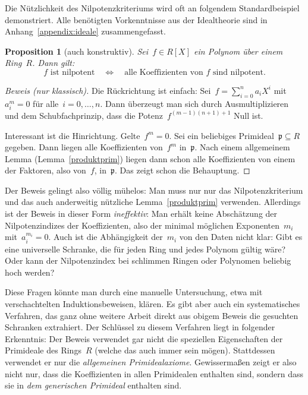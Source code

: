 \documentclass[a4paper,ngerman,12pt]{scrartcl}
\theoremstyle{definition}
\theoremstyle{plain}
\newtheorem{prop}[defn]{Proposition}
\theoremstyle{remark}
\newcommand{\pp}{\mathfrak{p}}
\renewcommand{\_}{\mathpunct{.}\,}
\newcommand{\?}{\,{:}\,}
\begin{document}
Die Nützlichkeit des Nilpotenzkriteriums wird oft an folgendem Standardbeispiel
demonstriert. Alle benötigten Vorkenntnisse aus der Idealtheorie sind in
Anhang~\ref{appendix:ideale} zusammengefasst.

\begin{prop}[auch konstruktiv]Sei~$f \in R[X]$ ein Polynom über einem Ring~$R$. Dann gilt:
\[ \text{$f$ ist nilpotent} \quad\Longleftrightarrow\quad
  \text{alle Koeffizienten von~$f$ sind nilpotent}. \]
\end{prop}
\begin{proof}[Beweis (nur klassisch)]Die Rückrichtung ist einfach: Sei~$f = \sum_{i=0}^n a_i X^i$
mit~$a_i^m = 0$ für alle~$i = 0,\ldots,n$. Dann überzeugt man sich durch
Ausmultiplizieren und dem Schubfachprinzip, dass die Potenz~$f^{(m-1)(n+1) +
1}$ Null ist.

Interessant ist die Hinrichtung. Gelte~$f^m = 0$. Sei ein beliebiges
Primideal~$\pp \subseteq R$ gegeben. Dann liegen alle Koeffizienten von~$f^m$
in~$\pp$. Nach einem allgemeinem Lemma (Lemma~\ref{produktprim}) liegen dann
schon alle Koeffizienten von einem der Faktoren, also von~$f$, in~$\pp$. Das
zeigt schon die Behauptung.
\end{proof}

Der Beweis gelingt also völlig mühelos: Man muss nur
nur das Nilpotenzkriterium und das auch anderweitig nützliche
Lemma~\ref{produktprim} verwenden. Allerdings ist der Beweis in dieser Form
\emph{ineffektiv}: Man erhält keine Abschätzung der Nilpotenzindizes der
Koeffizienten, also der minimal möglichen Exponenten~$m_i$ mit~$a_i^{m_i} = 0$.
Auch ist die Abhängigkeit der~$m_i$ von den Daten nicht klar: Gibt es eine
universelle Schranke, die für jeden Ring und jedes Polynom gültig wäre? Oder
kann der Nilpotenzindex bei schlimmen Ringen oder Polynomen beliebig hoch
werden?

Diese Fragen könnte man durch eine manuelle Untersuchung, etwa mit
verschachtelten Induktionsbeweisen, klären. Es gibt aber auch ein
systematisches Verfahren, das ganz ohne weitere Arbeit direkt aus obigem Beweis die
gesuchten Schranken extrahiert. Der Schlüssel zu diesem Verfahren liegt in
folgender Erkenntnis: Der Beweis verwendet gar nicht die speziellen
Eigenschaften der Primideale des Rings~$R$ (welche das auch immer sein mögen).
Stattdessen verwendet er nur die \emph{allgemeinen Primidealaxiome}. Gewissermaßen
zeigt er also nicht nur, dass die Koeffizienten in allen Primidealen enthalten
sind, sondern dass sie in \emph{dem generischen Primideal} enthalten sind.
\end{document}
